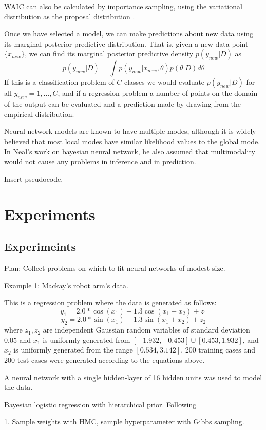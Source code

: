 \documentclass{book}
\begin{document}
\begin{enumerate}
WAIC can also be calculated by importance sampling, using the variational distribution as the proposal distribution \cite{yamada2012information}.

Once we have selected a model, we can make predictions about new data using its marginal posterior predictive distribution. That is, given a new data point $\{x_{new}\}$, we can find its marginal posterior predictive density $p(y_{new}|D)$ as 
\[ p(y_{new}|D) = \int p(y_{new}|x_{new},\theta) p(\theta|D) d\theta \]
If this is a classification problem of $C$ classes we would evaluate $p(y_{new}|D)$ for all $y_{new}=1,\dots, C$, and if a regression problem a number of points on the domain of the output can be evaluated 
and a prediction made by drawing from the empirical distribution. 


Neural network models are known to have multiple modes, although it is widely believed that most local modes have similar likelihood values to the global mode. In Neal's work on bayesian neural network, he also assumed that multimodality would not cause any problems in inference and in prediction. 


Insert pseudocode. 
\part{Experiments}
\chapter{Experimeints}
Plan:
Collect problems on which to fit neural networks of modest size. 

Example 1: Mackay's robot arm's data. 

This is a regression problem where the data is generated as follows:
\[ y_1 = 2.0 * \cos(x_1) + 1.3 \cos(x_1+x_2) + z_1 \]
\[ y_2 = 2.0 * \sin(x_1) + 1.3 \sin(x_1+x_2) + z_2 \]
where $z_1,z_2$ are independent Gaussian random variables of standard deviation
$0.05$ and $x_1$ is uniformly generated from $[-1.932,-0.453]\cup
[0.453,1.932]$, and $x_2$ is uniformly generated from the range $[0.534,3.142]$.
200 training cases and 200 test cases were generated according to the equations
above. 

A neural network with a single hidden-layer of 16 hidden units was used to model
the data.

Bayesian logistic regression with hierarchical prior. Following \cite{zhang2014semi}

1. Sample weights with HMC, sample hyperparameter with Gibbs sampling.


\end{enumerate}
\end{document}
